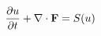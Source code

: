 \documentclass[preview]{standalone}
\begin{document}
\begin{align*}
\special{dvisvgm:raw <g id='unique000'>}\frac{\partial u}{\partial t} + \nabla \cdot \mathbf{F} = S(u)\special{dvisvgm:raw </g>}
\end{align*}
\end{document}
